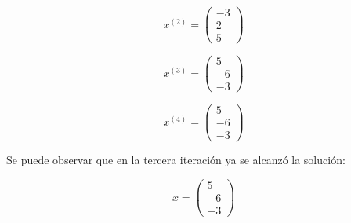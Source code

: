 $$
    x^{(2)}=\begin{pmatrix}
    -3\\
    2\\
    5
    \end{pmatrix}
$$

$$
    x^{(3)}=\begin{pmatrix}
    5\\
    -6\\
    -3
    \end{pmatrix}
$$

$$
    x^{(4)}=\begin{pmatrix}
    5\\
    -6\\
    -3
    \end{pmatrix}
$$

Se puede observar que en la tercera iteración ya se alcanzó la solución:

$$
    x=\begin{pmatrix}
    5\\
    -6\\
    -3
    \end{pmatrix}
$$

